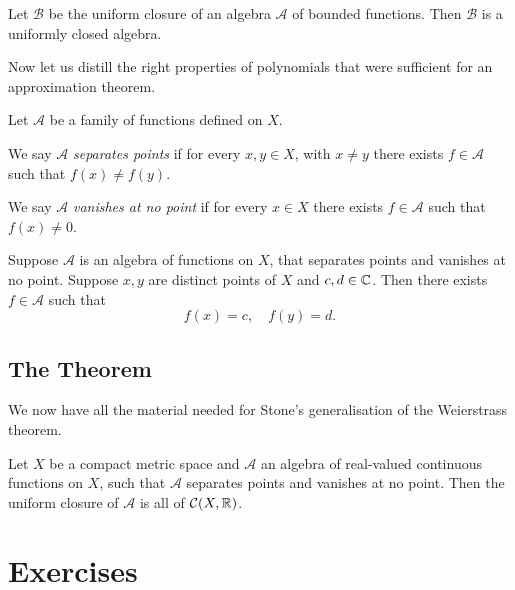 \begin{proposition}
Let $\mathscr{B}$ be the uniform closure of an algebra $\mathscr{A}$ of bounded functions. Then $\mathscr{B}$ is a uniformly closed algebra.
\end{proposition}

Now let us distill the right properties of polynomials that were sufficient for an approximation theorem.

\begin{definition}
Let $\mathscr{A}$ be a family of functions defined on $X$.

We say $\mathscr{A}$ \emph{separates points} if for every $x,y\in X$, with $x\neq y$ there exists $f\in\mathscr{A}$ such that $f(x)\neq f(y)$.

We say $\mathscr{A}$ \emph{vanishes at no point} if for every $x\in X$ there exists $f\in\mathscr{A}$ such that $f(x)\neq0$.
\end{definition}

\begin{example}

\end{example}

\begin{proposition}
Suppose $\mathscr{A}$ is an algebra of functions on $X$, that separates points and vanishes at no point. Suppose $x,y$ are distinct points of $X$ and $c,d\in\mathbb C$. Then there exists $f\in\mathscr{A}$ such that
\[f(x)=c,\quad f(y)=d.\]
\end{proposition}

\subsection{The Theorem}
We now have all the material needed for Stone's generalisation of the Weierstrass theorem. 

\begin{theorem}
Let $X$ be a compact metric space and $\mathscr{A}$ an algebra of real-valued continuous functions on $X$, such that $\mathscr{A}$ separates points and vanishes at no point. Then the uniform closure of $\mathscr{A}$ is all of $\mathcal{C}(X,\mathbb R)$.
\end{theorem}
\pagebreak

\section*{Exercises}
